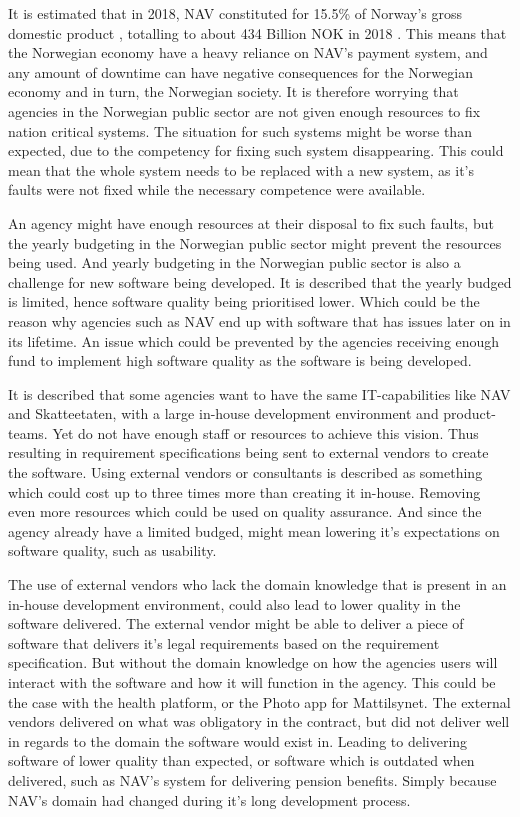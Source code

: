 It is estimated that in 2018, NAV constituted for 15.5\% of Norway's gross domestic product \cite{nav_ytelsene_frem_mot_2060_2019}, totalling to about 434 Billion NOK in 2018 \cite{faktaark_finansdepartementet_2020}. This means that the Norwegian economy have a heavy reliance on NAV's payment system, and any amount of downtime can have negative consequences for the Norwegian economy and in turn, the Norwegian society. It is therefore worrying that agencies in the Norwegian public sector are not given enough resources to fix nation critical systems. The situation for such systems might be worse than expected, due to the competency for fixing such system disappearing. This could mean that the whole system needs to be replaced with a new system, as it's faults were not fixed while the necessary competence were available.

An agency might have enough resources at their disposal to fix such faults, but the yearly budgeting in the Norwegian public sector might prevent the resources being used. And yearly budgeting in the Norwegian public sector is also a challenge for new software being developed. It is described that the yearly budged is limited, hence software quality being prioritised lower. Which could be the reason why agencies such as NAV end up with software that has issues later on in its lifetime. An issue which could be prevented by the agencies receiving enough fund to implement high software quality as the software is being developed.

It is described that some agencies want to have the same IT-capabilities like NAV and Skatteetaten, with a large in-house development environment and product-teams. Yet do not have enough staff or resources to achieve this vision. Thus resulting in requirement specifications being sent to external vendors to create the software. Using external vendors or consultants is described as something which could cost up to three times more than creating it in-house. Removing even more resources which could be used on quality assurance. And since the agency already have a limited budged, might mean lowering it's expectations on software quality, such as usability.

The use of external vendors who lack the domain knowledge that is present in an in-house development environment, could also lead to lower quality in the software delivered. The external vendor might be able to deliver a piece of software that delivers it's legal requirements based on the requirement specification. But without the domain knowledge on how the agencies users will interact with the software and how it will function in the agency. This could be the case with the health platform, or the Photo app for Mattilsynet. The external vendors delivered on what was obligatory in the contract, but did not deliver well in regards to the domain the software would exist in. Leading to delivering software of lower quality than expected, or software which is outdated when delivered, such as NAV's system for delivering pension benefits. Simply because NAV's domain had changed during it's long development process.

